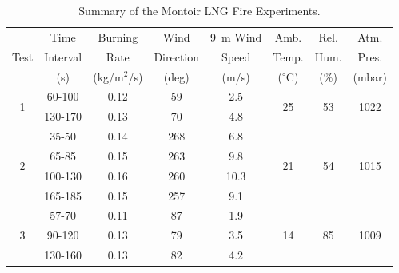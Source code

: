 \begin{table}[!ht]
\centering
\caption[Summary of the Montoir LNG Fire Experiments]{Summary of the Montoir LNG Fire Experiments.}
\label{Montoir_Summary}
\begin{tabular}{|c|c|c|c|c|c|c|c|}
\hline
                            & Time    & Burning      & Wind      & 9~m Wind & Amb.                & Rel.                & Atm.                    \\
Test                        & Interval& Rate         & Direction & Speed    & Temp.               & Hum.                & Pres.                   \\
                            & (s)     & (kg/m$^2$/s) & (deg)     & (m/s)    & ($^\circ$C)         & (\%)                & (mbar)                  \\ \hline \hline
\multirow{2}{*}{1}          & 60-100  & 0.12         & 59        & 2.5      & \multirow{2}{*}{25} & \multirow{2}{*}{53} & \multirow{2}{*}{1022}   \\  
                            & 130-170 & 0.13         & 70        & 4.8      &                     &                     &                         \\ \hline
\multirow{4}{*}{2}          & 35-50   & 0.14         & 268       & 6.8      & \multirow{4}{*}{21} & \multirow{4}{*}{54} & \multirow{4}{*}{1015}   \\
                            & 65-85   & 0.15         & 263       & 9.8      &                     &                     &                         \\
                            & 100-130 & 0.16         & 260       & 10.3     &                     &                     &                         \\
                            & 165-185 & 0.15         & 257       & 9.1      &                     &                     &                         \\ \hline
\multirow{3}{*}{3}          & 57-70   & 0.11         & 87        & 1.9      & \multirow{3}{*}{14} & \multirow{3}{*}{85} & \multirow{3}{*}{1009}   \\
                            & 90-120  & 0.13         & 79        & 3.5      &                     &                     &                         \\
                            & 130-160 & 0.13         & 82        & 4.2      &                     &                     &                         \\ \hline
\end{tabular}
\end{table}


